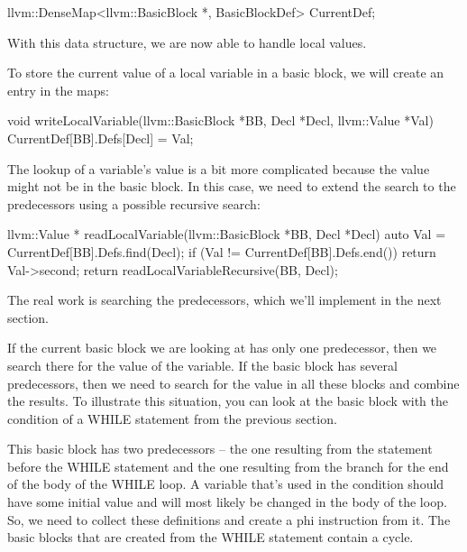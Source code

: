 \begin{cpp}
llvm::DenseMap<llvm::BasicBlock *, BasicBlockDef> CurrentDef;
\end{cpp}

With this data structure, we are now able to handle local values.


To store the current value of a local variable in a basic block, we will create an entry in the maps:

\begin{cpp}
void writeLocalVariable(llvm::BasicBlock *BB, Decl *Decl,
                        llvm::Value *Val) {
    CurrentDef[BB].Defs[Decl] = Val;
}
\end{cpp}

The lookup of a variable’s value is a bit more complicated because the value might not be in the basic block. In this case, we need to extend the search to the predecessors using a possible recursive search:

\begin{cpp}
llvm::Value *
readLocalVariable(llvm::BasicBlock *BB, Decl *Decl) {
    auto Val = CurrentDef[BB].Defs.find(Decl);
    if (Val != CurrentDef[BB].Defs.end())
        return Val->second;
    return readLocalVariableRecursive(BB, Decl);
}
\end{cpp}

The real work is searching the predecessors, which we’ll implement in the next section.


If the current basic block we are looking at has only one predecessor, then we search there for the value of the variable. If the basic block has several predecessors, then we need to search for the value in all these blocks and combine the results. To illustrate this situation, you can look at the basic block with the condition of a WHILE statement from the previous section.

This basic block has two predecessors – the one resulting from the statement before the WHILE statement and the one resulting from the branch for the end of the body of the WHILE loop. A variable that’s used in the condition should have some initial value and will most likely be changed in the body of the loop. So, we need to collect these definitions and create a phi instruction from it. The basic blocks that are created from the WHILE statement contain a cycle.

